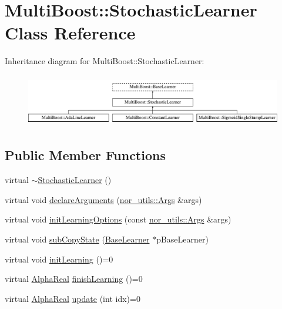 \hypertarget{classMultiBoost_1_1StochasticLearner}{
\section{MultiBoost::StochasticLearner Class Reference}
\label{classMultiBoost_1_1StochasticLearner}
}
Inheritance diagram for MultiBoost::StochasticLearner:\begin{figure}[H]
\begin{center}
\leavevmode
\includegraphics[height=2.314049cm]{classMultiBoost_1_1StochasticLearner}
\end{center}
\end{figure}
\subsection*{Public Member Functions}
\begin{DoxyCompactItemize}
\item 
virtual \hyperlink{classMultiBoost_1_1StochasticLearner_a6de4051f650759f54b58726c72937b5e}{$\sim$StochasticLearner} ()
\item 
virtual void \hyperlink{classMultiBoost_1_1StochasticLearner_acac37929c8e28a71b8f396f28666e912}{declareArguments} (\hyperlink{classnor__utils_1_1Args}{nor\_\-utils::Args} \&args)
\item 
virtual void \hyperlink{classMultiBoost_1_1StochasticLearner_a65ba4717def2118659f3adc6ae8a6324}{initLearningOptions} (const \hyperlink{classnor__utils_1_1Args}{nor\_\-utils::Args} \&args)
\item 
virtual void \hyperlink{classMultiBoost_1_1StochasticLearner_a1193858b7940baca90c2da3612a6e718}{subCopyState} (\hyperlink{classMultiBoost_1_1BaseLearner}{BaseLearner} $\ast$pBaseLearner)
\item 
virtual void \hyperlink{classMultiBoost_1_1StochasticLearner_a8deec80f68243d911f7d4ffa9c89d989}{initLearning} ()=0
\item 
virtual \hyperlink{Defaults_8h_a80184c4fd10ab70a1a17c5f97dcd1563}{AlphaReal} \hyperlink{classMultiBoost_1_1StochasticLearner_a54cf5f9cf396b6730da6deb4cfec7bc5}{finishLearning} ()=0
\item 
virtual \hyperlink{Defaults_8h_a80184c4fd10ab70a1a17c5f97dcd1563}{AlphaReal} \hyperlink{classMultiBoost_1_1StochasticLearner_a0827c95202f6f3f5180292f72f2f3e0f}{update} (int idx)=0
\end{DoxyCompactItemize}
